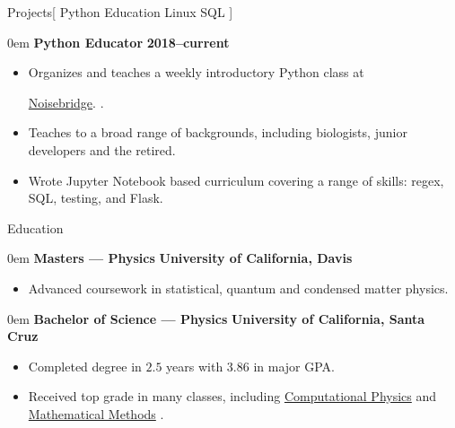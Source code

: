 \documentclass[11pt,a4paper]{article}
\newenvironment{headedsection}[2]{
    \begin{addmargin}[0.5em]{0em}
    {\large\bfseries #1} \hfill {\bfseries #2}%
    \begin{itemize}
        [label={}, topsep=0pt, itemsep=1.5pt, parsep=0pt, leftmargin=1.5em]
}{
    \end{itemize}
    \end{addmargin}
    \medskip
}
\newcommand{\Noisebridge}{
  \href{https://www.noisebridge.net/}{Noisebridge}.
}
\newcommand{\ComputationalPhysics}{
  \href{http://young.physics.ucsc.edu/115/}{Computational Physics}
}
\newcommand{\MathematicalMethods}{
  \href{http://scipp.ucsc.edu/~haber/ph116C/}{Mathematical Methods}
}
\begin{document}
\begin{mysection}{Projects}[
    Python \textbullet{} Education \textbullet{} Linux \textbullet{} SQL
]

  \begin{headedsection}{Python Educator}{2018--current}
    \item Organizes and teaches a weekly introductory Python class at
          \Noisebridge{}.
    \item Teaches to a broad range of backgrounds, including biologists,
          junior developers and the retired.
    \item Wrote Jupyter Notebook based curriculum covering a range of skills:
          regex, SQL, testing, and Flask.

  \end{headedsection}


\end{mysection}

\begin{mysection}{Education}
  \begin{headedsection}{Masters --- Physics}
        {University of California, Davis}

    \item Advanced coursework in statistical, quantum and condensed matter
          physics.

  \end{headedsection}

  \begin{headedsection}{Bachelor of Science --- Physics}
        {University of California, Santa Cruz}

    \item Completed degree in $2.5$ years with $3.86$ in major GPA.\@
    \item Received top grade in many classes, including \ComputationalPhysics{}
          and \MathematicalMethods{}.

  \end{headedsection}
\end{mysection}
\end{document}
